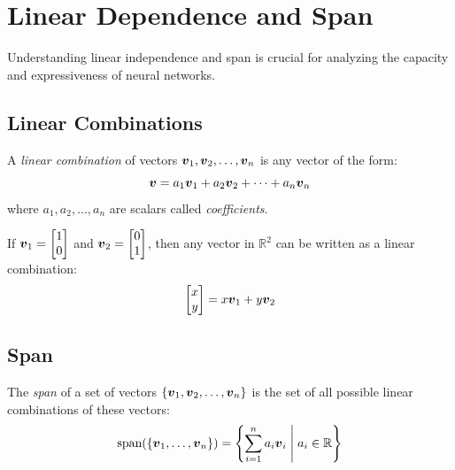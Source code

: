 
\section{Linear Dependence and Span}
\label{sec:linear-dependence-span}

Understanding linear independence and span is crucial for analyzing the capacity and expressiveness of neural networks.

\subsection{Linear Combinations}

A \emph{linear combination} of vectors $\boldsymbol{v}_1, \boldsymbol{v}_2, \ldots, \boldsymbol{v}_n$ is any vector of the form:
\begin{equation}
    \boldsymbol{v} = a_1\boldsymbol{v}_1 + a_2\boldsymbol{v}_2 + \cdots + a_n\boldsymbol{v}_n
\end{equation}
where $a_1, a_2, \ldots, a_n$ are scalars called \emph{coefficients}.

\begin{example}
If $\boldsymbol{v}_1 = \begin{bmatrix} 1 \\ 0 \end{bmatrix}$ and $\boldsymbol{v}_2 = \begin{bmatrix} 0 \\ 1 \end{bmatrix}$, then any vector in $\mathbb{R}^2$ can be written as a linear combination:
\begin{equation}
    \begin{bmatrix} x \\ y \end{bmatrix} = x\boldsymbol{v}_1 + y\boldsymbol{v}_2
\end{equation}
\end{example}

\subsection{Span}

\begin{definition}[Span]
The \emph{span} of a set of vectors $\{\boldsymbol{v}_1, \boldsymbol{v}_2, \ldots, \boldsymbol{v}_n\}$ is the set of all possible linear combinations of these vectors:
\begin{equation}
    \text{span}(\{\boldsymbol{v}_1, \ldots, \boldsymbol{v}_n\}) = \left\{ \sum_{i=1}^{n} a_i\boldsymbol{v}_i \;\middle|\; a_i \in \mathbb{R} \right\}
\end{equation}
\end{definition}

